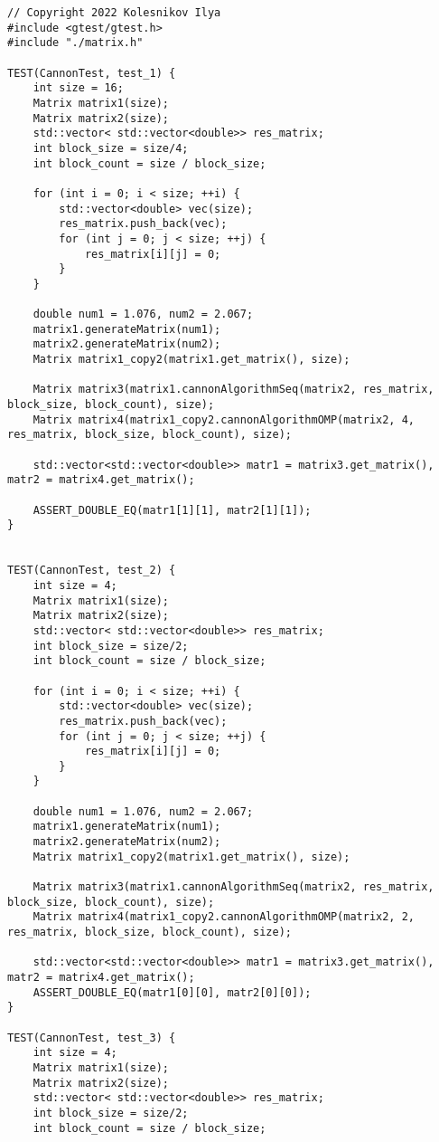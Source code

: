 \documentclass{report}
\begin{document}
\begin{lstlisting}
// Copyright 2022 Kolesnikov Ilya
#include <gtest/gtest.h>
#include "./matrix.h"

TEST(CannonTest, test_1) {
    int size = 16;
    Matrix matrix1(size);
    Matrix matrix2(size);
    std::vector< std::vector<double>> res_matrix;
    int block_size = size/4;
    int block_count = size / block_size;

    for (int i = 0; i < size; ++i) {
        std::vector<double> vec(size);
        res_matrix.push_back(vec);
        for (int j = 0; j < size; ++j) {
            res_matrix[i][j] = 0;
        }
    }

    double num1 = 1.076, num2 = 2.067;
    matrix1.generateMatrix(num1);
    matrix2.generateMatrix(num2);
    Matrix matrix1_copy2(matrix1.get_matrix(), size);

    Matrix matrix3(matrix1.cannonAlgorithmSeq(matrix2, res_matrix, block_size, block_count), size);
    Matrix matrix4(matrix1_copy2.cannonAlgorithmOMP(matrix2, 4, res_matrix, block_size, block_count), size);

    std::vector<std::vector<double>> matr1 = matrix3.get_matrix(), matr2 = matrix4.get_matrix();

    ASSERT_DOUBLE_EQ(matr1[1][1], matr2[1][1]);
}


TEST(CannonTest, test_2) {
    int size = 4;
    Matrix matrix1(size);
    Matrix matrix2(size);
    std::vector< std::vector<double>> res_matrix;
    int block_size = size/2;
    int block_count = size / block_size;

    for (int i = 0; i < size; ++i) {
        std::vector<double> vec(size);
        res_matrix.push_back(vec);
        for (int j = 0; j < size; ++j) {
            res_matrix[i][j] = 0;
        }
    }

    double num1 = 1.076, num2 = 2.067;
    matrix1.generateMatrix(num1);
    matrix2.generateMatrix(num2);
    Matrix matrix1_copy2(matrix1.get_matrix(), size);

    Matrix matrix3(matrix1.cannonAlgorithmSeq(matrix2, res_matrix, block_size, block_count), size);
    Matrix matrix4(matrix1_copy2.cannonAlgorithmOMP(matrix2, 2, res_matrix, block_size, block_count), size);

    std::vector<std::vector<double>> matr1 = matrix3.get_matrix(), matr2 = matrix4.get_matrix();
    ASSERT_DOUBLE_EQ(matr1[0][0], matr2[0][0]);
}

TEST(CannonTest, test_3) {
    int size = 4;
    Matrix matrix1(size);
    Matrix matrix2(size);
    std::vector< std::vector<double>> res_matrix;
    int block_size = size/2;
    int block_count = size / block_size;


\end{lstlisting}
\end{document}
